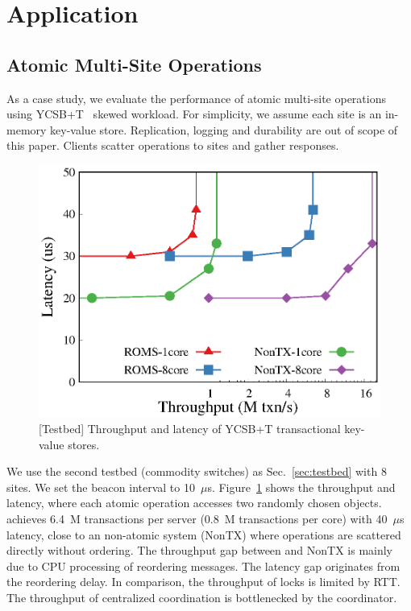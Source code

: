 \section{Application}
\label{sec:application}

\subsection{Atomic Multi-Site Operations}
\label{subsec:eval-kvs}

As a case study, we evaluate the performance of atomic multi-site operations using YCSB+T~\cite{dey2014ycsbt} skewed workload.
For simplicity, we assume each site is an in-memory key-value store.
Replication, logging and durability are out of scope of this paper.
Clients scatter operations to sites and gather responses.





\begin{figure}[t]
\centering
\includegraphics[width=.45\textwidth]{gnuplot/ycsb.eps}
\caption{[Testbed] Throughput and latency of YCSB+T transactional key-value stores.}
\label{fig:ycsb}
\end{figure}


We use the second testbed (commodity switches) as Sec.~\ref{sec:testbed} with 8 sites.
We set the beacon interval to 10~$\mu$s.
Figure~\ref{fig:ycsb} shows the throughput and latency, where each atomic operation accesses two randomly chosen objects.
\sys achieves 6.4~M transactions per server (0.8~M transactions per core) with 40~$\mu$s latency, close to an non-atomic system (NonTX) where operations are scattered directly without ordering.
The throughput gap between \sys and NonTX is mainly due to CPU processing of reordering messages.
The latency gap originates from the reordering delay.
In comparison, the throughput of locks is limited by RTT.
The throughput of centralized coordination is bottlenecked by the coordinator.

